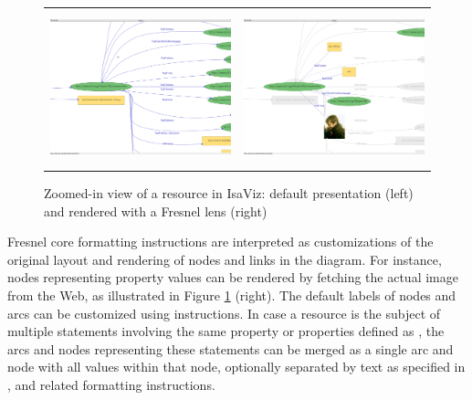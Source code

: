 \begin{figure}
\begin{tabular}{cc}
\includegraphics[height=4.45cm]{isavizscreen1.png} \hspace{0.04cm} &
\includegraphics[height=4.45cm]{isavizscreen2.png} \\
\end{tabular}
\vspace{-1em}
\caption{Zoomed-in view of a  resource in IsaViz: default presentation (left) and rendered with a Fresnel lens (right)}
\label{isvFresnelFig}
\end{figure}

Fresnel core formatting instructions are interpreted as customizations of the original layout and rendering of nodes and links in the diagram. For instance, nodes representing  property values can be rendered by fetching the actual image from the Web, as illustrated in Figure \ref{isvFresnelFig} (right). The default labels of nodes and arcs can be customized using  instructions. In case a resource is the subject of multiple statements involving the same property or properties defined as , the arcs and nodes representing these statements can be merged as a single arc and node with all values within that node, optionally separated by text as specified in ,  and related formatting instructions.
